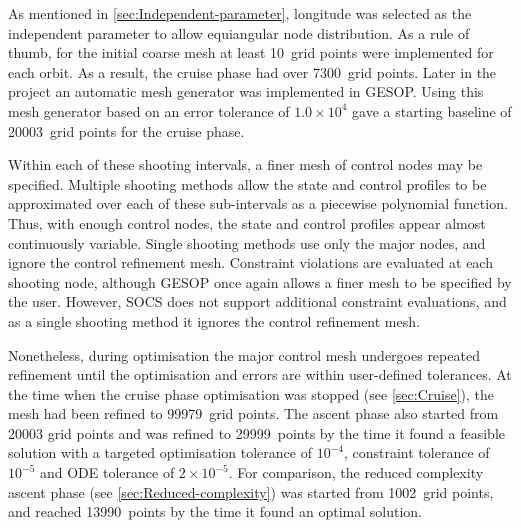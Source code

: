 As mentioned in \autoref{sec:Independent-parameter}, longitude was selected as the independent parameter to allow equiangular node distribution. As a rule of thumb, for the initial coarse mesh at least 10~grid points were implemented for each orbit. As a result, the cruise phase had over 7300~grid points. Later in the project an automatic mesh generator was implemented in GESOP. Using this mesh generator based on an error tolerance of $1.0\times10^4$ gave a starting baseline of 20003~grid points for the cruise phase. 

Within each of these shooting intervals, a finer mesh of control nodes may be specified. Multiple shooting methods allow the state and control profiles to be approximated over each of these sub-intervals as a piecewise polynomial function. Thus, with enough control nodes, the state and control profiles appear almost continuously variable. Single shooting methods use only the major nodes, and ignore the control refinement mesh. Constraint violations are evaluated at each shooting node, although GESOP once again allows a finer mesh to be specified by the user. However, SOCS does not support additional constraint evaluations, and as a single shooting method it ignores the control refinement mesh.

Nonetheless, during optimisation the major control mesh undergoes repeated refinement until the optimisation and errors are within user-defined tolerances. At the time when the cruise phase optimisation was stopped (see \autoref{sec:Cruise}), the mesh had been refined to 99979~grid points. The ascent phase also started from 20003 grid points and was refined to 29999~points by the time it found a feasible solution with a targeted optimisation tolerance of $10^{-4}$, constraint tolerance of $10^{-5}$ and ODE tolerance of $2\times10^{-5}$. For comparison, the reduced complexity ascent phase (see \autoref{sec:Reduced-complexity}) was started from 1002~grid points, and reached 13990~points by the time it found an optimal solution.



